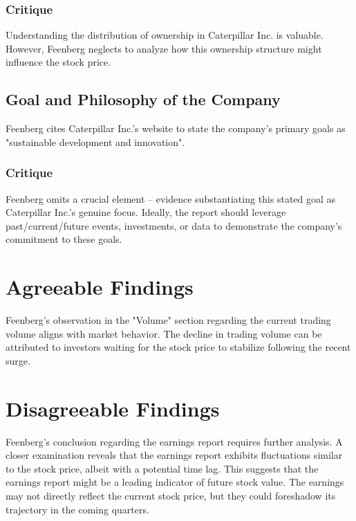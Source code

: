 \documentclass[9pt,a4paper,twoside]{tau}
\begin{document}
            \subsubsection{Critique}

                Understanding the distribution of ownership in Caterpillar Inc. is valuable. However, Feenberg neglects to analyze how this ownership structure might influence the stock price.
                
    \subsection{Goal and Philosophy of the Company}

        Feenberg cites Caterpillar Inc.'s website to state the company's primary goals as "sustainable development and innovation"\cite{feenberg-2024}.

            \subsubsection{Critique}

                Feenberg omits a crucial element –  evidence substantiating this stated goal as Caterpillar Inc.'s genuine focus. Ideally, the report should leverage past/current/future events, investments, or data to demonstrate the company's commitment to these goals. 

\section{Agreeable Findings}

    Feenberg's observation in the "Volume" section regarding the current trading volume aligns with market behavior. The decline in trading volume can be attributed to investors waiting for the stock price to stabilize following the recent surge. 

\section{Disagreeable Findings}    

    Feenberg's conclusion regarding the earnings report requires further analysis. A closer examination reveals that the earnings report exhibits fluctuations similar to the stock price, albeit with a potential time lag. This suggests that the earnings report might be a leading indicator of future stock value. The earnings may not directly reflect the current stock price, but they could foreshadow its trajectory in the coming quarters.
\end{document}
